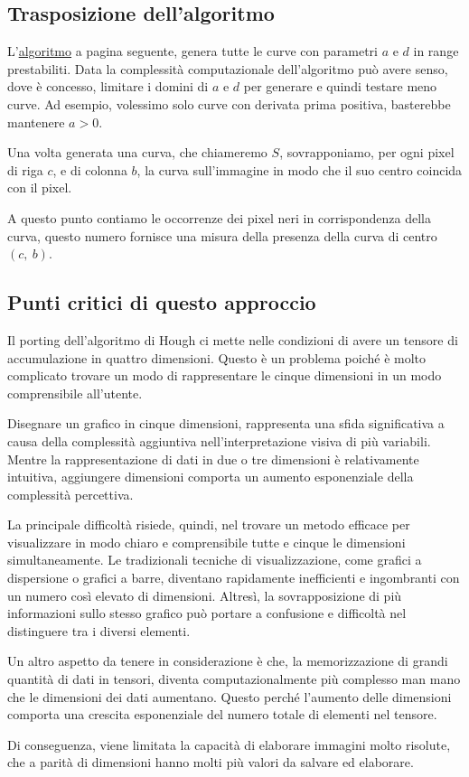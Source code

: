 \newpage

\subsection{Trasposizione dell'algoritmo}
L'\hyperref[lst:ostinelli_Tensore4]{algoritmo} a pagina seguente,  genera tutte le curve con parametri $a$ e $d$ in range prestabiliti. Data la complessità computazionale dell'algoritmo può avere senso, dove è concesso, limitare i domini di $a$ e $d$ per generare e quindi testare meno curve. Ad esempio, volessimo solo curve con derivata prima positiva, basterebbe mantenere $a>0$.\par
Una volta generata una curva, che chiameremo $S$, sovrapponiamo, per ogni pixel di riga $c$, e di colonna $b$, la curva sull'immagine in modo che il suo centro coincida con il pixel.\par
A questo punto contiamo le occorrenze dei pixel neri in corrispondenza della curva, questo numero fornisce una misura della presenza della curva di centro $(c,\ b)$.

\subsection{Punti critici di questo approccio}
Il porting dell'algoritmo di Hough ci mette nelle condizioni di avere un tensore di accumulazione in quattro dimensioni. Questo è un problema poiché è molto complicato trovare un modo di rappresentare le cinque dimensioni in un modo comprensibile all'utente.\par
Disegnare un grafico in cinque dimensioni, rappresenta una sfida significativa a causa della complessità aggiuntiva nell'interpretazione visiva di più variabili. Mentre la rappresentazione di dati in due o tre dimensioni è relativamente intuitiva, aggiungere dimensioni comporta un aumento esponenziale della complessità percettiva.\par
La principale difficoltà risiede, quindi, nel trovare un metodo efficace per visualizzare in modo chiaro e comprensibile tutte e cinque le dimensioni simultaneamente. Le tradizionali tecniche di visualizzazione, come grafici a dispersione o grafici a barre, diventano rapidamente inefficienti e ingombranti con un numero così elevato di dimensioni. Altresì, la sovrapposizione di più informazioni sullo stesso grafico può portare a confusione e difficoltà nel distinguere tra i diversi elementi.\par
Un altro aspetto da tenere in considerazione è che, la memorizzazione di grandi quantità di dati in tensori, diventa computazionalmente più complesso man mano che le dimensioni dei dati aumentano. Questo perché l'aumento delle dimensioni comporta una crescita esponenziale del numero totale di elementi nel tensore.\par
Di conseguenza, viene limitata la capacità di elaborare immagini molto risolute, che a parità di dimensioni hanno molti più valori da salvare ed elaborare.

\newpage

\newpage